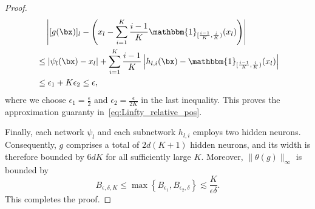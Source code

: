 \documentclass[11pt]{article}
\begin{document}
\begin{proof}
    \begin{equation*}
        \begin{aligned}
            & \quad \left| [g(\bx)]_l - \left( x_l - \sum_{i=1}^K \frac{i-1}{K} \mathbbm{1}_{[\frac{i-1}{K},\frac{i}{K})} (x_l) \right)\right| \\
            & \leq |\psi_l(\bx) - x_l| + \sum_{i=1}^K \frac{i - 1}{K} \left| h_{l, i}(\bx) - \mathbbm{1}_{[\frac{i-1}{K},\frac{i}{K})} (x_l)\right| \\
            & \leq \epsilon_1 + K \epsilon_{2} \leq \epsilon,
        \end{aligned}
    \end{equation*}
    where we choose $\epsilon_1 = \frac{\epsilon}{2}$ and $\epsilon_2 = \frac{\epsilon}{2 K}$ in the last inequality. This proves the approximation guaranty in~\eqref{eq:Linfty_relative_pos}.


    Finally, each network $\psi_{l}$ and each subnetwork $h_{l,i}$ employs two hidden neurons. Consequently, $g$ comprises a total of $2d(K+1)$ hidden neurons, and its width is therefore bounded by $6dK$ for all sufficiently large $K$. Moreover, $\|\theta(g)\|_{\infty}$ is bounded by
    \begin{equation*}
        B_{\epsilon,\delta, K} \leq \max \left\{ B_{\epsilon_1}, B_{\epsilon_2, \delta}\right\} \lesssim \frac{K}{\epsilon \delta}.
    \end{equation*}
    This completes the proof.
\end{proof}
\end{document}
